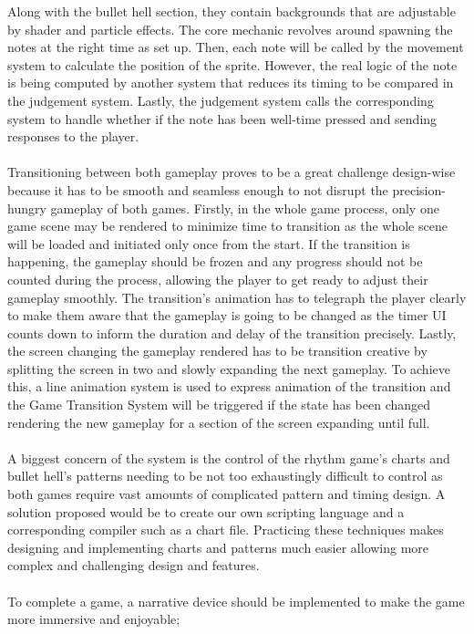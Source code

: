 Along with the bullet hell section, they contain backgrounds that are adjustable by shader and particle effects.
The core mechanic revolves around spawning the notes at the right time as set up.
Then, each note will be called by the movement system to calculate the position of the sprite.
However, the real logic of the note is being computed by another system that reduces its timing to be compared in the judgement system.
Lastly, the judgement system calls the corresponding system to handle whether if the note has been well-time pressed and sending responses to the player.
\\\\
Transitioning between both gameplay proves to be a great challenge design-wise
because it has to be smooth and seamless enough to not disrupt the precision-hungry gameplay of both games.
Firstly, in the whole game process, only one game scene may be rendered to minimize time to transition
as the whole scene will be loaded and initiated only once from the start.
If the transition is happening, the gameplay should be frozen and any progress should not be counted during the process,
allowing the player to get ready to adjust their gameplay smoothly.
The transition's animation has to telegraph the player clearly to make them aware that the gameplay is going to be changed
as the timer UI counts down to inform the duration and delay of the transition precisely.
Lastly, the screen changing the gameplay rendered has to be transition creative by splitting the screen in two and slowly expanding the next gameplay.
To achieve this, a line animation system is used to express animation of the transition
and the Game Transition System will be triggered if the state has been changed rendering the new gameplay for a section of the screen expanding until full.
\\\\
A biggest concern of the system is the control of the rhythm game’s charts and bullet hell’s patterns
needing to be not too exhaustingly difficult to control as both games require vast amounts of complicated pattern and timing design.
A solution proposed would be to create our own scripting language and a corresponding compiler such as a chart file.
Practicing these techniques makes designing and implementing charts and patterns much easier
allowing more complex and challenging design and features.
\\\\
To complete a game, a narrative device should be implemented to make the game more immersive and enjoyable;
